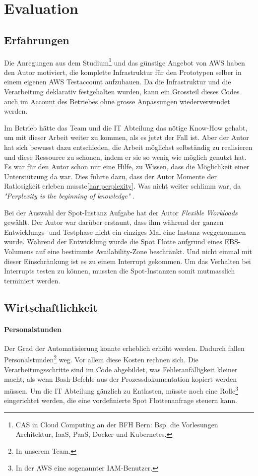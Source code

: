 \section{Evaluation}
\subsection{Erfahrungen}
Die Anregungen aus dem Studium\footnote{CAS in Cloud Computing an der BFH Bern: Bsp. die Vorlesungen Architektur, IaaS, PaaS, Docker und Kubernetes.} und das günstige Angebot von AWS haben den Autor motiviert, die komplette Infrastruktur für den Prototypen selber in einem eigenen AWS Testaccount aufzubauen. Da die Infrastruktur und die Verarbeitung deklarativ festgehalten wurden, kann ein Grossteil dieses Codes auch im Account des Betriebes ohne grosse Anpassungen wiederverwendet werden.

Im Betrieb hätte das Team und die IT Abteilung das nötige Know-How gehabt, um mit dieser Arbeit weiter zu kommen, als es jetzt der Fall ist. Aber der Autor hat sich bewusst dazu entschieden, die Arbeit möglichst selbständig zu realisieren und  diese Ressource zu schonen, indem er sie so wenig wie möglich genutzt hat. Es war für den Autor schon nur eine Hilfe, zu Wissen, dass die Möglichkeit einer Unterstützung da war. Dies führte dazu, dass der Autor Momente der Ratlosigkeit erleben musste\ref{har:perplexity}. Was nicht weiter schlimm war, da \textit{"Perplexity is the beginning of knowledge"} \autocite[33]{CloudNativ:1}.

Bei der Auswahl der Spot-Instanz Aufgabe hat der Autor \emph{Flexible Workloads} gewählt. Der Autor war darüber erstaunt, dass ihm während der ganzen Entwicklungs- und Testphase nicht ein einziges Mal eine Instanz weggenommen wurde. Während der Entwicklung wurde die Spot Flotte aufgrund eines EBS-Volumens auf eine bestimmte Availability-Zone beschränkt. Und nicht einmal mit dieser Einschränkung ist es zu einem Interrupt gekommen. Um das Verhalten bei Interrupts testen zu können, mussten die Spot-Instanzen somit mutmasslich terminiert werden.


\subsection{Wirtschaftlichkeit}
\paragraph{Personalstunden}
Der Grad der Automatisierung konnte erheblich erhöht werden. Dadurch fallen Personalstunden\footnote{In unserem Team.} weg. Vor allem diese Kosten rechnen sich. Die Verarbeitungsschritte sind im Code abgebildet, was Fehleranfälligkeit kleiner macht, als wenn Bash-Befehle aus der Prozessdokumentation kopiert werden müssen. Um die IT Abteilung gänzlich zu Entlasten, müsste noch eine Rolle\footnote{In der AWS eine sogenannter IAM-Benutzer.} eingerichtet werden, die eine vordefinierte Spot Flottenanfrage steuern kann.
